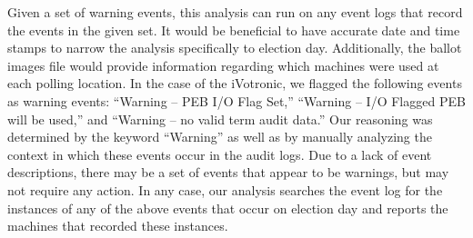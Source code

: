 Given a set of warning events, this analysis can run on any event logs that record the events in the given set. It would be beneficial to have accurate date and time stamps to narrow the analysis specifically to election day. Additionally, the ballot images file would provide information regarding which machines were used at each polling location.  In the case of the iVotronic, we flagged the following events as warning events: \textquotedblleft Warning – PEB I/O Flag Set,\textquotedblright \hspace{1 mm} \textquotedblleft Warning – I/O Flagged PEB will be used,\textquotedblright \hspace{1 mm} and \textquotedblleft Warning – no valid term audit data.\textquotedblright \hspace{2 mm} Our reasoning was determined by the keyword “Warning” as well as by manually analyzing the context in which these events occur in the audit logs. Due to a lack of event descriptions, there may be a set of events that appear to be warnings, but may not require any action. In any case, our analysis searches the event log for the instances of any of the above events that occur on election day and reports the machines that recorded these instances. 
